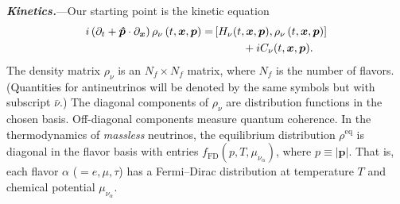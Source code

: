 \documentclass[aps,prl,twocolumn,groupedaddress]{revtex4-2}
\begin{document}
\textbf{\textit{Kinetics.}}---Our starting point is the kinetic equation
\begin{align}
i \left( \partial_t + \boldsymbol{\hat{p}} \cdot \partial_{\boldsymbol{x}} \right) \rho_\nu \left( t, \boldsymbol{x}, \boldsymbol{p} \right) = &\left[ H_\nu (t, \boldsymbol{x}, \boldsymbol{p} ), \rho_\nu \left( t, \boldsymbol{x}, \boldsymbol{p} \right) \right] \notag \\
&~~~~~~~~ + iC_\nu (t, \boldsymbol{x}, \boldsymbol{p}). \label{eq:qke}
\end{align}
The density matrix $\rho_\nu$ is an $N_f \times N_f$ matrix, where $N_f$ is the number of flavors. (Quantities for antineutrinos will be denoted by the same symbols but with subscript $\bar{\nu}$.) The diagonal components of $\rho_\nu$ are distribution functions in the chosen basis. Off-diagonal components measure quantum coherence. In the thermodynamics of \textit{massless} neutrinos, the equilibrium distribution $\rho^\textrm{eq}$ is diagonal in the flavor basis with entries $f_\textrm{FD} (p, T, \mu_{\nu_\alpha})$, where $p \equiv |\boldsymbol{p}|$. That is, each flavor $\alpha$ ($ = e, \mu, \tau$) has a Fermi--Dirac distribution at temperature $T$ and chemical potential $\mu_{\nu_\alpha}$.
\end{document}
